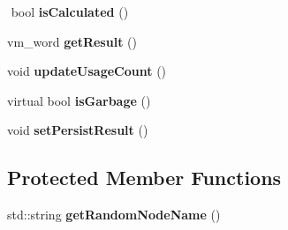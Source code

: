\begin{DoxyCompactItemize}
$$\mbox{\label{classathena_1_1core_1_1_node_af75ed35cf7ec81f686292b1cef4c549d}} 
bool {\bfseries is\+Calculated} ()
\item 
\mbox{\label{classathena_1_1core_1_1_node_ae2568f40260ef891d79618c16d2fc1a8}} 
vm\+\_\+word {\bfseries get\+Result} ()
\item 
\mbox{\label{classathena_1_1core_1_1_node_ae160501f8419f9874bd71aefe6daa3dc}} 
void {\bfseries update\+Usage\+Count} ()
\item 
\mbox{\label{classathena_1_1core_1_1_node_ad0e6344fe6940e59d79eb4b05a7a5b96}} 
virtual bool {\bfseries is\+Garbage} ()
\item 
\mbox{\label{classathena_1_1core_1_1_node_adf4b0a1427264f01de4e6d93e6349f18}} 
void {\bfseries set\+Persist\+Result} ()
\end{DoxyCompactItemize}
\subsection*{Protected Member Functions}
\begin{DoxyCompactItemize}
\item 
\mbox{\label{classathena_1_1core_1_1_node_aa2aee4b3d80299df55739295d8f7040a}} 
std\+::string {\bfseries get\+Random\+Node\+Name} ()
\end{DoxyCompactItemize}
